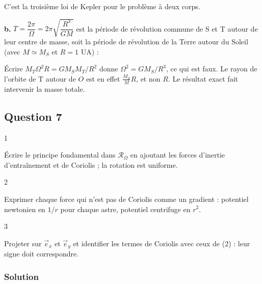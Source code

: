 \documentclass[11pt,a4paper]{article}
\newcommand{\equationajustee}[1]{%
  \sbox{\boiteequation}{$\displaystyle #1$}%
  \ifdim\wd\boiteequation>\linewidth
    \[\resizebox{\linewidth}{!}{\usebox{\boiteequation}}\]%
  \else
    \[#1\]%
  \fi}
\begin{document}
\equationajustee{\boxed{\Omega=\sqrt{\frac{GM}{R^3}}}}

C'est la troisième loi de Kepler pour le problème à deux corps.

\textbf{b.} \(T=\dfrac{2\pi}{\Omega}=2\pi\sqrt{\dfrac{R^3}{GM}}\) est la période de révolution commune de S et T autour de leur centre de masse, soit la période de révolution de la Terre autour du Soleil (avec \(M\simeq M_S\) et \(R=1\) UA) :

\equationajustee{\boxed{T\approx1\ \text{an}\approx3\times10^7\ \mathrm s}}

\begin{piege}

Écrire \(M_T\Omega^2R=GM_SM_T/R^2\) donne \(\Omega^2=GM_S/R^3\), ce qui est faux. Le rayon de l'orbite de T autour de \(O\) est en effet \(\frac{M_S}{M}R\), et non \(R\). Le résultat exact fait intervenir la masse totale.

\end{piege}

\hypertarget{question-7}{%
\subsection{Question 7}\label{question-7}}

\begin{indication}{1}

Écrire le principe fondamental dans \(\mathcal R_\Omega\) en ajoutant les forces d'inertie d'entraînement et de Coriolis ; la rotation est uniforme.

\end{indication}

\begin{indication}{2}

Exprimer chaque force qui n'est pas de Coriolis comme un gradient : potentiel newtonien en \(1/r\) pour chaque astre, potentiel centrifuge en \(r^2\).

\end{indication}

\begin{indication}{3}

Projeter sur \(\vec e_x\) et \(\vec e_y\) et identifier les termes de Coriolis avec ceux de (2) : leur signe doit correspondre.

\end{indication}

\hypertarget{solution-6}{%
\subsubsection{Solution}\label{solution-6}}
\end{document}
